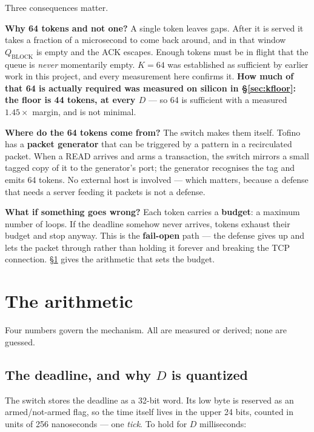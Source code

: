 \documentclass[10pt,a4paper,oneside]{article}
\newcommand{\num}[1]{\mbox{#1}}
\begin{document}
Three consequences matter.

\textbf{Why 64 tokens and not one?} A single token leaves gaps. After it is served it takes
a fraction of a microsecond to come back around, and in that window $Q_{\mathrm{BLOCK}}$ is
empty and the ACK escapes. Enough tokens must be in flight that the queue is
\emph{never} momentarily empty. $K=64$ was established as sufficient by earlier work in
this project, and every measurement here confirms it. \textbf{How much of that 64 is
actually required was measured on silicon in \S\ref{sec:kfloor}: the floor is 44 tokens, at
every $D$} --- so 64 is sufficient with a measured $1.45\times$ margin, and is not minimal.

\textbf{Where do the 64 tokens come from?} The switch makes them itself. Tofino has a
\textbf{packet generator} that can be triggered by a pattern in a recirculated packet. When
a READ arrives and arms a transaction, the switch mirrors a small tagged copy of it to the
generator's port; the generator recognises the tag and emits 64 tokens. No external host is
involved --- which matters, because a defense that needs a server feeding it packets is not
a defense.

\textbf{What if something goes wrong?} Each token carries a \textbf{budget}: a maximum
number of loops. If the deadline somehow never arrives, tokens exhaust their budget and
stop anyway. This is the \textbf{fail-open} path --- the defense gives up and lets the
packet through rather than holding it forever and breaking the TCP connection.
\S\ref{sec:arith} gives the arithmetic that sets the budget.

\section{The arithmetic}
\label{sec:arith}

Four numbers govern the mechanism. All are measured or derived; none are guessed.

\subsection{The deadline, and why \texorpdfstring{$D$}{D} is quantized}

The switch stores the deadline as a 32-bit word. Its low byte is reserved as an
armed/not-armed flag, so the time itself lives in the upper 24 bits, counted in units of
\num{256} nanoseconds --- one \emph{tick}. To hold for $D$ milliseconds:
\end{document}
